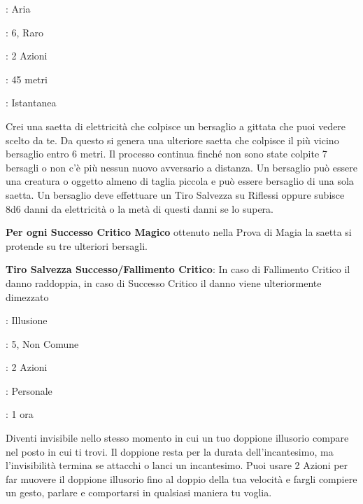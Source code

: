 \begin{multicols}{2}
\noindent\colorbox{OBSSgold!10}{
\begin{minipage}{0.95\linewidth}
\begin{description}[noitemsep, topsep=0pt, parsep=0pt, partopsep=0pt, leftmargin=0cm, labelwidth=1.3cm]
	\item[\textbf{Lista}]: Aria
	\item[\textbf{Livello}]: 6, Raro
	\item[\textbf{Lancio}]: 2 Azioni
	\item[\textbf{Gittata}]: 45 metri
	\item[\textbf{Durata}]: Istantanea
\end{description}
\end{minipage}}\smallskip

Crei una saetta di elettricità che colpisce un bersaglio a gittata che puoi vedere scelto da te. Da questo si genera una ulteriore saetta che colpisce il più vicino bersaglio entro 6 metri. Il processo continua finché non sono state colpite 7 bersagli o non c'è più nessun nuovo avversario a distanza. Un bersaglio può essere una creatura o oggetto almeno di taglia piccola e può essere bersaglio di una sola saetta. Un bersaglio deve effettuare un Tiro Salvezza su Riflessi oppure subisce 8d6 danni da elettricità o la metà di questi danni se lo supera.

\textbf{Per ogni Successo Critico Magico} ottenuto nella Prova di Magia la saetta si protende su tre ulteriori bersagli.

\textbf{Tiro Salvezza Successo/Fallimento Critico}: In caso di Fallimento Critico il danno raddoppia, in caso di Successo Critico il danno viene ulteriormente dimezzato

\noindent\colorbox{OBSSgold!10}{
\begin{minipage}{0.95\linewidth}
\begin{description}[noitemsep, topsep=0pt, parsep=0pt, partopsep=0pt, leftmargin=0cm, labelwidth=1.3cm]
	\item[\textbf{Lista}]: Illusione
	\item[\textbf{Livello}]: 5, Non Comune
	\item[\textbf{Lancio}]: 2 Azioni
	\item[\textbf{Gittata}]: Personale
	\item[\textbf{Durata}]: 1 ora
\end{description}
\end{minipage}}\smallskip

Diventi invisibile nello stesso momento in cui un tuo doppione illusorio compare nel posto in cui ti trovi. Il doppione resta per la durata dell'incantesimo, ma l'invisibilità termina se attacchi o lanci un incantesimo. Puoi usare 2 Azioni per far muovere il doppione illusorio fino al doppio della tua velocità e fargli compiere un gesto, parlare e comportarsi in qualsiasi maniera tu voglia.


\end{multicols}
